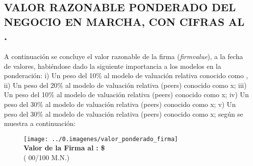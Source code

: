 
\newcommand{\ponda}{\peersa}
\newcommand{\pondaPorcentage}{10}
\newcommand{\pondb}{\peersb}
\newcommand{\pondbPorcentage}{20}
\newcommand{\pondc}{\peersc}
\newcommand{\pondcPorcentage}{10}
\newcommand{\pondd}{\peersd}
\newcommand{\ponddPorcentage}{30}
\newcommand{\ponde}{\peersd}
\newcommand{\pondePorcentage}{30}

\subsection{VALOR RAZONABLE PONDERADO DEL NEGOCIO EN MARCHA, CON CIFRAS AL \fechaValoresCorto.}

A continuaci\'on se concluye el valor razonable de la firma (\textit{\gls{firmvalue}}), a la fecha de valores, habi\'endose dado la siguiente importancia a los modelos en la ponderaci\'on: i) Un peso del \pondaPorcentage\% al modelo de valuaci\'on relativa conocido como \ponda{}, ii) Un peso del \pondbPorcentage\%  al modelo de valuaci\'on relativa (\gls{peers}) conocido como \pondb{} x; iii) Un peso del \pondcPorcentage\%  al modelo de valuaci\'on relativa (\gls{peers}) conocido como \pondc{} x; iv) Un peso del \ponddPorcentage\%  al modelo de valuaci\'on relativa (\gls{peers}) conocido como \pondd{} x;  v) Un peso del \pondePorcentage\%  al modelo de valuaci\'on relativa (\gls{peers}) conocido como \ponde{} x; seg\'un se muestra a continuaci\'on:

\begin{figure}[H]
\centering
\texttt{[image: ../0.imagenes/valor\_ponderado\_firma]}\\[10pt]

\textbf{\textcolor{principal}{Valor de la Firma al  \fechaValoresCorto:} \$\valorFirma{} \monedaCode}\\[5pt]
(\textcolor{principal}{\valorFirmaLetra{} \moneda{} 00/100 M.N.})
\end{figure}
